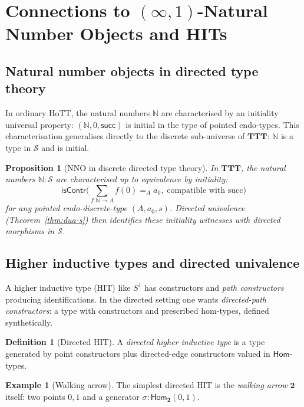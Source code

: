 \documentclass[12pt]{article}
\newtheorem{proposition}[theorem]{Proposition}
\theoremstyle{definition}
\newtheorem{definition}[theorem]{Definition}
\newtheorem{example}[theorem]{Example}
\theoremstyle{remark}
\newcommand{\N}{\mathbb{N}}
\newcommand{\Hom}{\mathsf{Hom}}
\newcommand{\isContr}{\mathsf{isContr}}
\newcommand{\TTT}{\mathbf{TTT}}
\newcommand{\twoI}{\mathbf{2}}
\begin{document}
\section{\texorpdfstring{Connections to $(\infty,1)$-Natural Number Objects and HITs}{Connections to (infinity,1)-Natural Number Objects and HITs}}\label{sec:hit}

\subsection{Natural number objects in directed type theory}

In ordinary HoTT, the natural numbers $\N$ are characterised by an initiality universal property: $(\N, 0, \mathsf{succ})$ is initial in the type of pointed endo-types. This characterisation generalises directly to the discrete sub-universe of $\TTT$: $\N$ is a type in $\mathcal{S}$ and is initial.

\begin{proposition}[NNO in discrete directed type theory]\label{prop:nno-disc}
In $\TTT$, the natural numbers $\N : \mathcal{S}$ are characterised up to equivalence by initiality:
\[
\isContr\Big( \sum_{f : \N \to A} f(0) =_A a_0, \;\text{compatible with succ} \Big)
\]
for any pointed endo-discrete-type $(A, a_0, s)$. Directed univalence (Theorem~\ref{thm:dua-s}) then identifies these initiality witnesses with directed morphisms in $\mathcal{S}$.
\end{proposition}

\subsection{Higher inductive types and directed univalence}

A higher inductive type (HIT) like $S^1$ has constructors and \emph{path constructors} producing identifications. In the directed setting one wants \emph{directed-path constructors}: a type with constructors and prescribed hom-types, defined synthetically.

\begin{definition}[Directed HIT]\label{def:dhit}
A \emph{directed higher inductive type} is a type generated by point constructors plus directed-edge constructors valued in $\Hom$-types.
\end{definition}

\begin{example}[Walking arrow]\label{ex:walking-arrow}
The simplest directed HIT is the \emph{walking arrow} $\twoI$ itself: two points $0, 1$ and a generator $\sigma : \Hom_{\twoI}(0,1)$.
\end{example}
\end{document}
